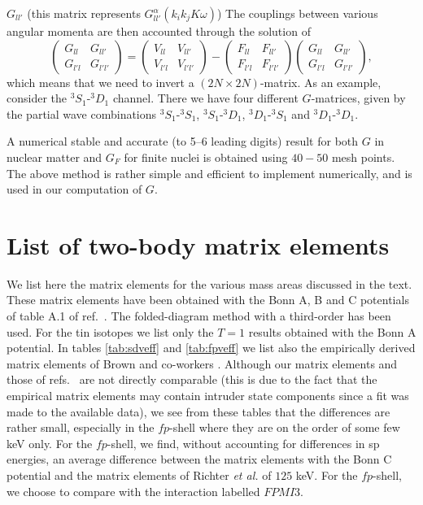 $G_{ll'}$ (this matrix represents   
$G^{\alpha}_{ll'}(k_ik_jK\omega)$) 
The couplings between various angular momenta are then accounted through the
solution of 
\begin{equation}
\label{eq:matrlign}           
\left( \begin{array}{lr}
G_{ll}  & G_{ll'} \\
G_{l'l} & G_{l'l'} 
\end{array} \right)
=
\left( \begin{array}{lr}
V_{ll}   & V_{ll'} \\
V_{l'l}  & V_{l'l'} 
\end{array} \right)
-
\left( \begin{array}{lr}
F_{ll}  & F_{ll'} \\
F_{l'l} & F_{l'l'} 
\end{array} \right)
\left( \begin{array}{lr}
G_{ll}  & G_{ll'} \\
G_{l'l} & G_{l'l'} 
\end{array} \right),
\end{equation}
which means that we need to invert a $(2N\times 2N)$-matrix.
As an example, consider the $^3S_1$-$^3D_1$ channel. There we have four
different $G$-matrices, given by the partial wave combinations
$^3S_1$-$^3S_1$, $^3S_1$-$^3D_1$, $^3D_1$-$^3S_1$ and $^3D_1$-$^3D_1$.

A numerical stable and accurate (to 5--6 leading digits)
result for both $G$ in nuclear matter and $G_F$ for finite
nuclei is obtained using $40-50$ mesh points.
The above method is rather  simple and efficient to implement 
numerically, and is used in our computation of $G$.

\clearpage

\section{List of two-body matrix elements}
We list here the matrix elements for the various mass areas
discussed in the text. These matrix elements have been obtained
with the Bonn A, B and C potentials of table A.1 of ref.\
\cite{mac89}. The folded-diagram method with a 
third-order \qbox has been used. For the tin isotopes we list only the $T=1$
results obtained with the Bonn A potential.
In tables \ref{tab:sdveff} and \ref{tab:fpveff} we list also the
empirically derived matrix elements of Brown and co-workers
\cite{brown88,richt91}. Although our matrix elements and those
of refs.\ \cite{brown88,richt91} are not directly 
comparable (this is due to the fact that the empirical 
matrix elements may contain intruder state components since 
a fit was made to the available data), we see from these tables that the
differences are rather small, especially in the
$fp$-shell where they are on the order of some few keV only. For the
$fp$-shell, we find, without accounting for differences
in sp energies, an average difference between the matrix elements
with the Bonn C potential and the matrix elements of Richter
{\em et al.} of $125$ keV.
For the $fp$-shell, we choose to compare with the
interaction labelled $FPMI3$.

